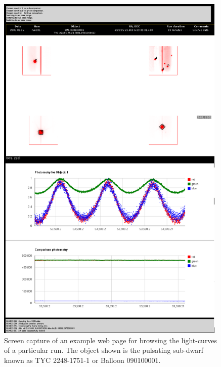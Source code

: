 \begin{figure}[!h]
	\centering
	\includegraphics[width=110mm]{images/run031_on_the_night_of_2005-08-15.png}
	\caption{Screen capture of an example web page for browsing the light-curves of a particular run. The object shown is the pulsating sub-dwarf known as TYC 2248-1751-1 or Balloon 090100001.}
	\label{browser}
\end{figure}

  
